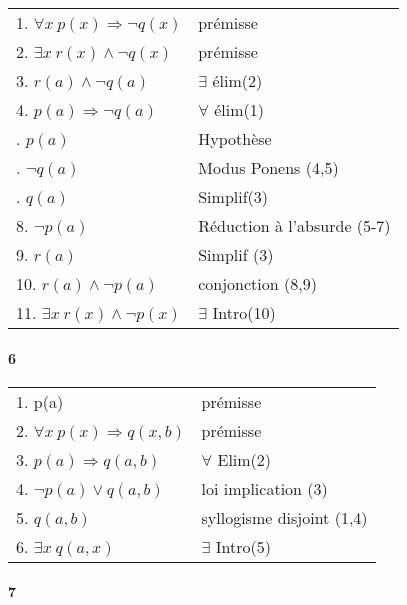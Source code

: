             \begin{tabular}{|l|l|}
            \hline
            1. $ \forall x \ p(x) \Rightarrow \neg q(x) $ & prémisse\\
            2. $ \exists x \ r(x) \land \neg q(x) $ & prémisse\\
            3. $ r(a) \land \neg q(a) $ & $\exists$ élim(2)\\
            4. $ p(a) \Rightarrow \neg q(a) $ & $\forall$ élim(1)\\
            \indent 5. $ p(a) $ & Hypothèse \\
            \indent 6. $ \neg q(a) $ & Modus Ponens (4,5) \\
            \indent 7. $ q(a) $ & Simplif(3) \\
            8. $ \neg p(a) $ & Réduction à l'absurde (5-7)\\
            9. $ r(a) $ & Simplif (3) \\
            10. $ r(a) \land \neg p(a) $ & conjonction (8,9)\\
            11. $ \exists x \ r(x) \land \neg p(x) $ & $\exists$ Intro(10) \\
            
            \hline
            \end{tabular}
            
        \paragraph{6}
            
            \begin{tabular}{|l|l|}
            \hline 
            1. p(a) & prémisse \\
            2. $ \forall x \ p(x) \Rightarrow q(x,b) $ & prémisse \\
            3. $ p(a) \Rightarrow q(a,b) $ & $\forall$ Elim(2) \\
            4. $ \neg p(a) \lor q(a,b) $ & loi implication (3) \\
            5. $ q(a,b) $ & syllogisme disjoint (1,4) \\
            6. $ \exists x \ q(a,x) $ & $\exists$ Intro(5) \\
            \hline
            \end{tabular}
            
             
        \paragraph{7}
            
